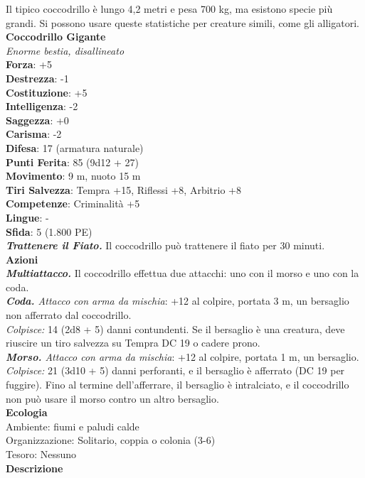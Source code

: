 \begin{multicols}{2}
Il tipico coccodrillo è lungo 4,2 metri e pesa 700 kg, ma esistono specie più grandi. Si possono usare queste statistiche per creature simili, come gli alligatori. \\


\medskip\textbf{Coccodrillo Gigante}\\
\emph{Enorme bestia, disallineato}\\
\textbf{Forza}: +5\\
\textbf{Destrezza}: -1\\
\textbf{Costituzione}: +5\\
\textbf{Intelligenza}: -2\\
\textbf{Saggezza}: +0\\
\textbf{Carisma}: -2\\
\textbf{Difesa}: 17 (armatura naturale)\\
\textbf{Punti Ferita}: 85 (9d12 + 27)\\
\textbf{Movimento}: 9 m, nuoto 15 m\\
\textbf{Tiri Salvezza}: Tempra +15, Riflessi +8, Arbitrio +8 \\
\textbf{Competenze}: Criminalità +5\\
\textbf{Lingue}: -\\
\textbf{Sfida}: 5 (1.800 PE)\smallskip\\
\emph{\textbf{Trattenere il Fiato.}} Il coccodrillo può trattenere il fiato per 30 minuti.\\
\smallskip\textbf{Azioni}\\
\emph{\textbf{Multiattacco.}} Il coccodrillo effettua due attacchi: uno con il morso e uno con la coda.\\
\emph{\textbf{Coda.} Attacco con arma da mischia}: +12 al colpire, portata 3 m, un bersaglio non afferrato dal coccodrillo.\\
\emph{Colpisce:} 14 (2d8 + 5) danni contundenti. Se il bersaglio è una creatura, deve riuscire un tiro salvezza su Tempra DC  19 o cadere prono.\\
\emph{\textbf{Morso.} Attacco con arma da mischia}: +12 al colpire, portata 1 m, un bersaglio.\\
\emph{Colpisce:} 21 (3d10 + 5) danni perforanti, e il bersaglio è afferrato (DC  19 per fuggire). Fino al termine dell'afferrare, il bersaglio è intralciato, e il coccodrillo non può usare il morso contro un altro bersaglio.\\
\textbf{Ecologia}\\
Ambiente: fiumi e paludi calde\\
Organizzazione: Solitario, coppia o colonia (3-6)\\
Tesoro: Nessuno\\
\textbf{Descrizione}\\


\end{multicols}
